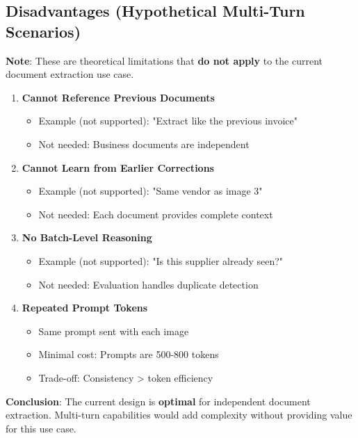 \documentclass[11pt,a4paper]{article}
\begin{document}
\subsection{Disadvantages (Hypothetical Multi-Turn Scenarios)}

\textbf{Note}: These are theoretical limitations that \textbf{do not apply} to the current document extraction use case.

\begin{enumerate}[leftmargin=*]
    \item \textbf{Cannot Reference Previous Documents}
    \begin{itemize}
        \item Example (not supported): "Extract like the previous invoice"
        \item Not needed: Business documents are independent
    \end{itemize}

    \item \textbf{Cannot Learn from Earlier Corrections}
    \begin{itemize}
        \item Example (not supported): "Same vendor as image 3"
        \item Not needed: Each document provides complete context
    \end{itemize}

    \item \textbf{No Batch-Level Reasoning}
    \begin{itemize}
        \item Example (not supported): "Is this supplier already seen?"
        \item Not needed: Evaluation handles duplicate detection
    \end{itemize}

    \item \textbf{Repeated Prompt Tokens}
    \begin{itemize}
        \item Same prompt sent with each image
        \item Minimal cost: Prompts are 500-800 tokens
        \item Trade-off: Consistency > token efficiency
    \end{itemize}
\end{enumerate}

\textbf{Conclusion}: The current design is \textbf{optimal} for independent document extraction. Multi-turn capabilities would add complexity without providing value for this use case.
\end{document}
